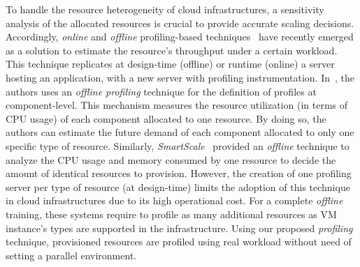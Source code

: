 To handle the resource heterogeneity of cloud infrastructures, a sensitivity analysis of the allocated resources is crucial to provide accurate scaling decisions. Accordingly, \emph{online} and \emph{offline} profiling-based techniques~\cite{kaviani_profiling-as--service:_2011} have recently emerged as a solution to  estimate the resource's throughput under a certain workload. This technique replicates at design-time (offline) or runtime (online) a server hosting an application, with a new server with profiling instrumentation. In~\cite{roy_2011}, the authors uses an \emph{offline profiling} technique for the definition of profiles at component-level. This mechanism measures the resource utilization (in terms of CPU usage) of each component allocated to one resource. By doing so, the authors can estimate the future demand of each component allocated to only one specific type of resource. Similarly, \emph{SmartScale}~\cite{smartscale_2012} provided an \emph{offline} technique to analyze the CPU usage and memory consumed by one resource to decide the amount of identical resources to provision. However, the creation of one profiling server per type of resource (at design-time) limits the adoption of this technique in cloud infrastructures due to its high operational cost. For a complete \emph{offline} training, these systems require to profile as many additional resources as VM instance's types are supported in the infrastructure. Using our proposed \emph{profiling} technique, provisioned resources are profiled using real workload without need of setting a parallel environment.


